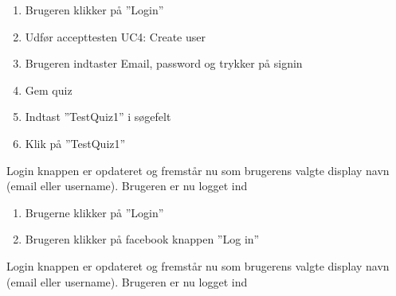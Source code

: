 

		{
		\begin{enumerate}
			\item Brugeren klikker på ''Login''
			\item Udfør accepttesten UC4: Create user
			\item Brugeren indtaster Email, password og trykker på signin
			\item Gem quiz
			\item Indtast ''TestQuiz1'' i søgefelt
			\item Klik på ''TestQuiz1''
		\end{enumerate}
		} %
		{Login knappen er opdateret og fremstår nu som brugerens valgte display navn (email eller username). Brugeren er nu logget ind} %
		{} %
		{} %

		{
		\begin{enumerate}
			\item Brugerne klikker på ''Login''
			\item Brugeren klikker på facebook knappen ''Log in''
		\end{enumerate}
		} %
		{Login knappen er opdateret og fremstår nu som brugerens valgte display navn (email eller username). Brugeren er nu logget ind} %
		{} %
		{} %

